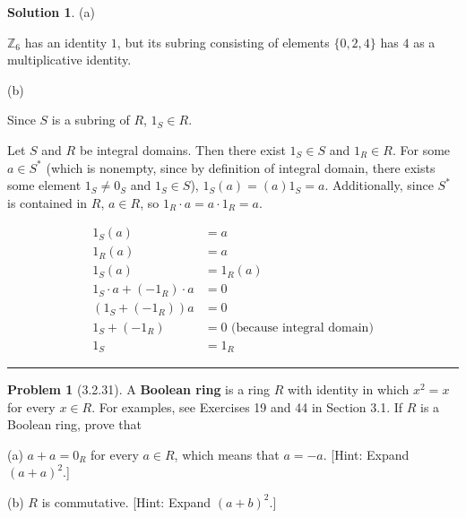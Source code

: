 \documentclass[12pt]{article}
\theoremstyle{definition}
\newtheorem*{prob}{Problem}
\newtheorem*{soln}{Solution}
\newcommand{\hr}{\vspace*{\parskip}\hrule}
\newcommand{\ZZ}{{\mathbb{Z}}}
\begin{document}
\begin{soln} (a)

$\ZZ_6$ has an identity $1$, but its subring consisting of elements
$\{0, 2, 4\}$ has $4$ as a multiplicative identity.

(b)

Since $S$ is a subring of $R$, $1_S\in R$.


Let $S$ and $R$ be integral domains. Then there exist $1_S \in S$ and $1_R \in R$.
For some $a\in S^*$ (which is nonempty, since by definition of integral domain, there exists some element $1_S\neq0_S$ and $1_S\in S$), $1_S(a)=(a)1_S=a$.
Additionally, since $S^*$ is contained in $R$, $a\in R$, so $1_R\cdot a=a\cdot 1_R=a$.

\begin{align*}
1_S(a)&=a\\
1_R(a)&=a\\
1_S(a)&=1_R(a)\\
1_S\cdot a+(-1_R)\cdot a&= 0\\
(1_S+(-1_R))a&=0\\
1_S+(-1_R)&=0\text{ (because integral domain)}\\
1_S&=1_R
\end{align*}

\end{soln}


\hr

%
%


\begin{prob}[3.2.31]
A \textbf{Boolean ring} is a ring $R$ with identity in which 
$x^2 = x$ for every $x\in R$. For examples, see Exercises 19 and 44 in Section 3.1. 
If $R$ is a Boolean ring, prove that      

(a)   $a + a = 0_R$ for every $a\in R$, which means that $a = -a$. 
[Hint: Expand $(a + a)^2$.]     

(b) $R$ is commutative. [Hint: Expand $(a + b)^2$.]
\end{prob}
\end{document}

